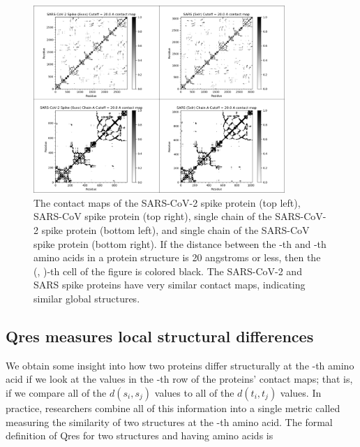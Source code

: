 \begin{figure}[h]
	\centering
	\mySfFamily
	\includegraphics[width = 0.85\textwidth]{../images/Contact.png}
	\caption{The contact maps of the SARS-CoV-2 spike protein (top left), SARS-CoV spike protein (top right), single chain of the SARS-CoV-2 spike protein (bottom left), and single chain of the SARS-CoV spike protein (bottom right). If the distance between the -th and -th amino acids in a protein structure is 20 angstroms or less, then the (, )-th cell of the figure is colored black. The SARS-CoV-2 and SARS spike proteins have very similar contact maps, indicating similar global structures.}
	\label{fig:contact_map}
\end{figure}

\begin{qbox}\end{qbox}

\FloatBarrier
{}
\subsection{Qres measures local structural differences}

We obtain some insight into how two proteins differ structurally at the -th amino acid if we look at the values in the -th row of the proteins' contact maps; that is, if we compare all of the $d(s_{i}, s_{j})$ values to all of the $d(t_{i}, t_{j})$ values. In practice, researchers combine all of this information into a single metric called  measuring the similarity of two structures at the -th amino acid. The formal definition of Qres for two structures  and  having  amino acids is

